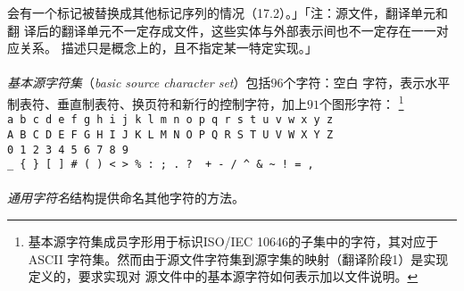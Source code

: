 \begin{enumerate}[label={\arabic*}]
{    会有一个标记被替换成其他标记序列的情况（17.2）。」「注：源文件，翻译单元和翻
    译后的翻译单元不一定存成文件，这些实体与外部表示间也不一定存在一一对应关系。
    描述只是概念上的，且不指定某一特定实现。」}
\end{enumerate}

\paragraph{}
\textit{基本源字符集}（\textit{basic source character set}）包括$96$个字符：空白
字符，表示水平制表符、垂直制表符、换页符和新行的控制字符，加上$91$个图形字符：
\footnote{基本源字符集成员字形用于标识ISO/IEC 10646的子集中的字符，其对应于ASCII
字符集。然而由于源文件字符集到源字集的映射（翻译阶段1）是实现定义的，要求实现对
源文件中的基本源字符如何表示加以文件说明。}                                   \\
\mbox{\qquad \texttt{a b c d e f g h i j k l m n o p q r s t u v w x y z}}    \\
\mbox{\qquad \texttt{A B C D E F G H I J K L M N O P Q R S T U V W X Y Z}}    \\
\mbox{\qquad \texttt{0 1 2 3 4 5 6 7 8 9}}                                    \\
\mbox{\qquad \texttt{\_ \{ \} [ ] \# ( ) \textless{} \textgreater{} \% :\ ; .\
?\ \textasteriskcentered{} + - / \textasciicircum{} \& \textbar{}
\textasciitilde{} !\ = , \bs{} \dq{} \sq}}

\paragraph{}
\textit{通用字符名}结构提供命名其他字符的方法。


